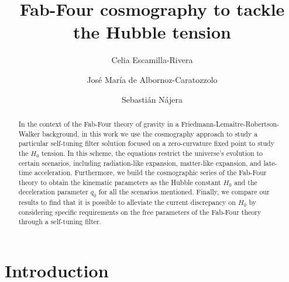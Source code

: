 \documentclass[onecolumn,superscriptaddress,secnumarabic,amssymb,amsmath,nobibnotes,aps,prd,nofootinbib,altaffilletter]{revtex4}
\begin{document}
\title{Fab-Four cosmography to tackle the Hubble tension}

\author{Celia Escamilla-Rivera}

\author{Jos\'e Mar\'ia de Albornoz-Caratozzolo}

\author{Sebasti\'an N\'ajera}


\begin{abstract}
In the context of the Fab-Four theory of gravity in a Friedmann-Lemaître-Robertson-Walker background, in this work we use the cosmography approach to study a particular self-tuning filter solution focused on a zero-curvature fixed point to study the $H_0$ tension. In this scheme, the equations restrict the universe's evolution to certain scenarios, including radiation-like expansion, matter-like expansion, and late-time acceleration. Furthermore, we build the cosmographic series of the Fab-Four theory to obtain the kinematic parameters as the Hubble constant $H_0$ and the deceleration parameter $q_0$ for all the scenarios mentioned. Finally, we compare our results to find that it is possible to alleviate the current discrepancy on $H_0$ by considering specific requirements on the free parameters of the Fab-Four theory through a self-tuning filter.
\end{abstract}

\maketitle


\section{Introduction}
\end{document}
